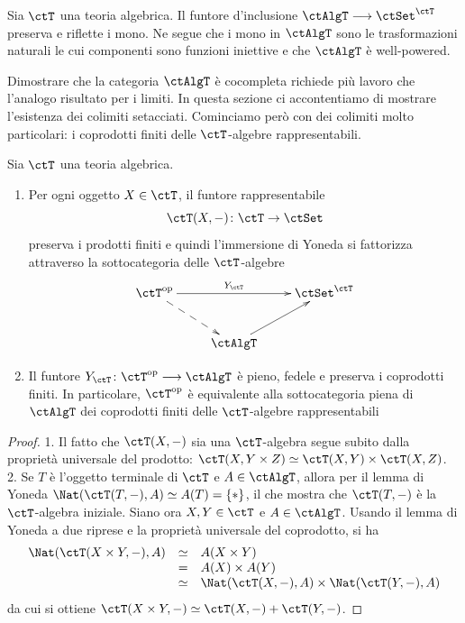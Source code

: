 \begin{corollary}\label{cor_mono_AlgT}
 Sia \(\ctT\) una teoria algebrica. Il funtore d'inclusione \(\ctAlgT \fun \ctSet^{\ctT}\) preserva e riflette i mono. Ne segue che
 i mono in \(\ctAlgT\) sono le trasformazioni naturali le cui componenti sono funzioni iniettive e che \(\ctAlgT\) è well-powered.
\end{corollary}

Dimostrare che la categoria \(\ctAlgT\) è cocompleta richiede più lavoro che l'analogo risultato per i limiti. In questa sezione ci
accontentiamo di mostrare l'esistenza dei colimiti setacciati. Cominciamo però con dei colimiti molto particolari: i coprodotti finiti
delle \(\ctT\)-algebre rappresentabili.

\begin{proposition}\label{prop_Yoneda_alg}
 Sia \(\ctT\) una teoria algebrica.
 \begin{enumerate}
  \item Per ogni oggetto \(X \in \ctT\), il funtore rappresentabile
        \[\ctT(X,-) \colon \ctT \to \ctSet\]
        preserva i prodotti finiti e quindi l'immersione di Yoneda si fattorizza attraverso la sottocategoria delle \(\ctT\)-algebre
        \[\xymatrix{\ctT^{\mathrm{op}} \ar[rr]^-{Y_{\ctT}} \ar@{-->}[rd] & & \ctSet^{\ctT} \\
         & \ctAlgT \ar[ru] }\]
  \item Il funtore \(Y_{\ctT} \colon \ctT^{\mathrm{op}} \fun \ctAlgT\) è pieno, fedele e preserva i coprodotti finiti. In particolare,
        \(\ctT^{\mathrm{op}}\) è equivalente alla sottocategoria piena di \(\ctAlgT\) dei coprodotti finiti delle \(\ctT\)-algebre rappresentabili
 \end{enumerate}
\end{proposition}

\begin{proof}
 1. Il fatto che \(\ctT(X,-)\) sia una \(\ctT\)-algebra segue subito dalla proprietà universale del prodotto:
 \(\ctT(X,Y \times Z) \simeq \ctT(X,Y) \times \ctT(X,Z)\). \\
 2. Se \(T\) è l'oggetto terminale di \(\ctT\) e \(A \in \ctAlgT\), allora per il lemma di Yoneda
 \(\Nat(\ctT(T,-),A) \simeq A(T) = \{\ast\}\), il che mostra che \(\ctT(T,-)\) è la \(\ctT\)-algebra iniziale.
 Siano ora \(X,Y \in \ctT\) e \(A \in \ctAlgT\). Usando il lemma di Yoneda a due riprese e la proprietà universale del coprodotto, si ha
 \[\begin{array}{rcl}
   \Nat(\ctT(X \times Y,-),A) & \simeq & A(X \times Y)                              \\
                              & =      & A(X) \times A(Y)                           \\
                              & \simeq & \Nat(\ctT(X,-),A) \times \Nat(\ctT(Y,-),A)
  \end{array}\]
 da cui si ottiene \(\ctT(X \times Y,-) \simeq \ctT(X,-) + \ctT(Y,-)\).
\end{proof}

